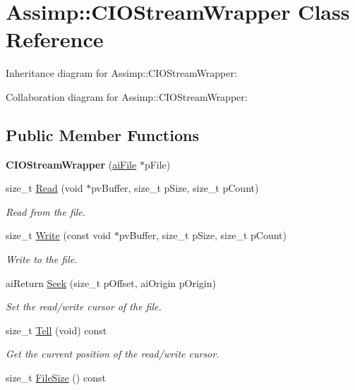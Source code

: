 \hypertarget{class_assimp_1_1_c_i_o_stream_wrapper}{\section{Assimp\+:\+:C\+I\+O\+Stream\+Wrapper Class Reference}
\label{class_assimp_1_1_c_i_o_stream_wrapper}
}


Inheritance diagram for Assimp\+:\+:C\+I\+O\+Stream\+Wrapper\+:


Collaboration diagram for Assimp\+:\+:C\+I\+O\+Stream\+Wrapper\+:
\subsection*{Public Member Functions}
\begin{DoxyCompactItemize}
\item 
\hypertarget{class_assimp_1_1_c_i_o_stream_wrapper_aa3a73c0aad7e4330a93203484ebef60c}{{\bfseries C\+I\+O\+Stream\+Wrapper} (\hyperlink{structai_file}{ai\+File} $\ast$p\+File)}\label{class_assimp_1_1_c_i_o_stream_wrapper_aa3a73c0aad7e4330a93203484ebef60c}

\item 
size\+\_\+t \hyperlink{class_assimp_1_1_c_i_o_stream_wrapper_a571f61faa1d00f6c96afcfbb22a13651}{Read} (void $\ast$pv\+Buffer, size\+\_\+t p\+Size, size\+\_\+t p\+Count)
\begin{DoxyCompactList}\small\item\em Read from the file. \end{DoxyCompactList}\item 
size\+\_\+t \hyperlink{class_assimp_1_1_c_i_o_stream_wrapper_a6db07944a779a7cc8639c3b198b61c1a}{Write} (const void $\ast$pv\+Buffer, size\+\_\+t p\+Size, size\+\_\+t p\+Count)
\begin{DoxyCompactList}\small\item\em Write to the file. \end{DoxyCompactList}\item 
ai\+Return \hyperlink{class_assimp_1_1_c_i_o_stream_wrapper_ae7a9345d4e02a00854e6a2c673bea0af}{Seek} (size\+\_\+t p\+Offset, ai\+Origin p\+Origin)
\begin{DoxyCompactList}\small\item\em Set the read/write cursor of the file. \end{DoxyCompactList}\item 
size\+\_\+t \hyperlink{class_assimp_1_1_c_i_o_stream_wrapper_a49f588a9ff46289b09f35489ff533d15}{Tell} (void) const 
\begin{DoxyCompactList}\small\item\em Get the current position of the read/write cursor. \end{DoxyCompactList}\item 
\hypertarget{class_assimp_1_1_c_i_o_stream_wrapper_a518a339aec2165178ea18e05242f0b81}{size\+\_\+t \hyperlink{class_assimp_1_1_c_i_o_stream_wrapper_a518a339aec2165178ea18e05242f0b81}{File\+Size} () const }\label{class_assimp_1_1_c_i_o_stream_wrapper_a518a339aec2165178ea18e05242f0b81}


\end{DoxyCompactItemize}
